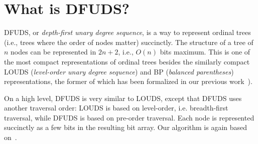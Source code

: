 \documentclass[11pt]{article}
\begin{document}
\maketitle

\section{What is DFUDS?}
DFUDS, or \emph{depth-first unary degree sequence}, is a way to represent ordinal
trees (i.e., trees where the order of nodes matter) succinctly. The structure of
a tree of $n$ nodes can be represented in $2n + 2$, i.e., $O(n)$ bits maximum. This
is one of the most compact representations of ordinal trees besides the similarly
compact LOUDS (\emph{level-order unary degree sequence}) and BP (\emph{balanced parentheses})
representations, the former of which has been formalized in our previous work~\cite{succinct}). 

On a high level, DFUDS is very similar to LOUDS, except that DFUDS uses another traversal order:
LOUDS is based on level-order, i.e. breadth-first traversal, while DFUDS is based on pre-order
traversal. Each node is represented succinctly as a few bits in the resulting bit array. Our
algorithm is again based on~\cite{navarro}.

\newpage
\end{document}
